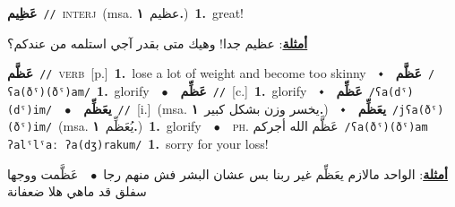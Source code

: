 \documentclass[10pt,a4paper,twoside]{article} %
\begin{document}
\begin{multicols}{2}
{\setlength\topsep{0pt}\textbf{\foreignlanguage{arabic}{عَظِيم}}\ {\color{gray}\texttt{//}\color{black}}\ \textsc{interj}\ \color{gray}(msa. \foreignlanguage{arabic}{عظيم}~\foreignlanguage{arabic}{\textbf{١.}})\color{black}\ \textbf{1.}~great!\  \begin{flushright}\color{gray}\foreignlanguage{arabic}{\textbf{\underline{\foreignlanguage{arabic}{أمثلة}}}: عظيم جدا! وهيك متى بقدر آجي استلمه من عندكم؟}\end{flushright}\color{black}} \vspace{2mm}

{\setlength\topsep{0pt}\textbf{\foreignlanguage{arabic}{عَظَّم}}\ {\color{gray}\texttt{//}\color{black}}\ \textsc{verb}\ [p.]\ \textbf{1.}~lose a lot of weight and become too skinny\ \ $\smblkdiamond$\ \ \setlength\topsep{0pt}\textbf{\foreignlanguage{arabic}{عَظَّم}}\ {\color{gray}\texttt{/ʕa(ðˤ)(ðˤ)am/}\color{black}}\ \textbf{1.}~glorify\ \ $\bullet$\ \ \setlength\topsep{0pt}\textbf{\foreignlanguage{arabic}{عَظِّم}}\ {\color{gray}\texttt{//}\color{black}}\ [c.]\ \textbf{1.}~glorify\ \ $\smblkdiamond$\ \ \setlength\topsep{0pt}\textbf{\foreignlanguage{arabic}{عَظِّم}}\ {\color{gray}\texttt{/ʕa(dˤ)(dˤ)im/}\color{black}}\ \ $\bullet$\ \ \setlength\topsep{0pt}\textbf{\foreignlanguage{arabic}{يعَظِّم}}\ {\color{gray}\texttt{//}\color{black}}\ [i.]\ \color{gray}(msa. \foreignlanguage{arabic}{يخسر وزن بشكل كبير}~\foreignlanguage{arabic}{\textbf{١.}})\color{black}\ \ $\smblkdiamond$\ \ \setlength\topsep{0pt}\textbf{\foreignlanguage{arabic}{يعَظِّم}}\ {\color{gray}\texttt{/jʕa(ðˤ)(ðˤ)im/}\color{black}}\ \color{gray}(msa. \foreignlanguage{arabic}{يُعَظِّم}~\foreignlanguage{arabic}{\textbf{١.}})\color{black}\ \textbf{1.}~glorify\ \ $\bullet$\ \ \textsc{ph.} \color{gray} \foreignlanguage{arabic}{عَظَّم الله أجركم}\color{black}\ {\color{gray}\texttt{/{\sffamily ʕa(ðˤ)(ðˤ)am ʔalˤlˤaː ʔa(dʒ)rakum}/}\color{black}}\ \textbf{1.}~sorry for your loss!\  \begin{flushright}\color{gray}\foreignlanguage{arabic}{\textbf{\underline{\foreignlanguage{arabic}{أمثلة}}}: الواحد مالازم يعَظِّم غير ربنا بس عشان البشر فش منهم رجا\ $\bullet$\ \  عَظَّمت ووجها سفلق قد ماهي هلا ضعفانة}\end{flushright}\color{black}} \vspace{2mm}


\end{multicols}
\end{document}
